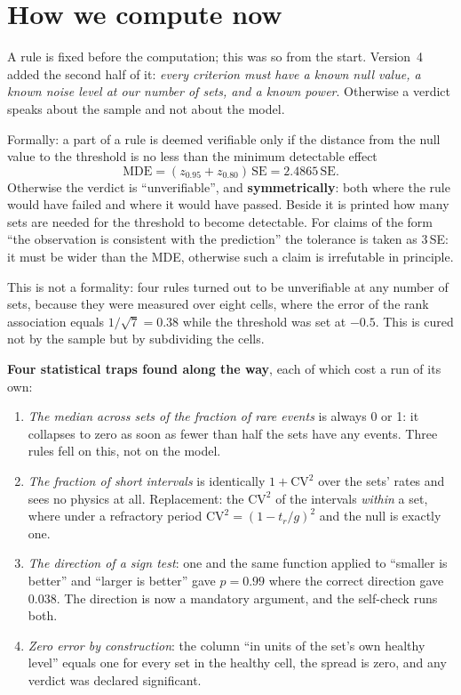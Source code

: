 \section{How we compute now}\label{sec:method}
A rule is fixed before the computation; this was so from the start. Version~4 added the second half of it: \emph{every criterion must have a known null value, a known noise level at our number of sets, and a known power}. Otherwise a verdict speaks about the sample and not about the model.

Formally: a part of a rule is deemed verifiable only if the distance from the null value to the threshold is no less than the minimum detectable effect
\[\mathrm{MDE}=(z_{0.95}+z_{0.80})\,\mathrm{SE}=2.4865\,\mathrm{SE}.\]
Otherwise the verdict is ``unverifiable'', and \textbf{symmetrically}: both where the rule would have failed and where it would have passed. Beside it is printed how many sets are needed for the threshold to become detectable. For claims of the form ``the observation is consistent with the prediction'' the tolerance is taken as 3\,SE: it must be wider than the MDE, otherwise such a claim is irrefutable in principle.

This is not a formality: four rules turned out to be unverifiable at any number of sets, because they were measured over eight cells, where the error of the rank association equals $1/\sqrt{7}=0.38$ while the threshold was set at $-0.5$. This is cured not by the sample but by subdividing the cells.

\textbf{Four statistical traps found along the way}, each of which cost a run of its own:
\begin{enumerate}
\item \emph{The median across sets of the fraction of rare events} is always 0 or 1: it collapses to zero as soon as fewer than half the sets have any events. Three rules fell on this, not on the model.
\item \emph{The fraction of short intervals} is identically $1+\mathrm{CV}^2$ over the sets' rates and sees no physics at all. Replacement: the $\mathrm{CV}^2$ of the intervals \emph{within} a set, where under a refractory period $\mathrm{CV}^2=(1-t_r/g)^2$ and the null is exactly one.
\item \emph{The direction of a sign test}: one and the same function applied to ``smaller is better'' and ``larger is better'' gave $p=0.99$ where the correct direction gave 0.038. The direction is now a mandatory argument, and the self-check runs both.
\item \emph{Zero error by construction}: the column ``in units of the set's own healthy level'' equals one for every set in the healthy cell, the spread is zero, and any verdict was declared significant.
\end{enumerate}

